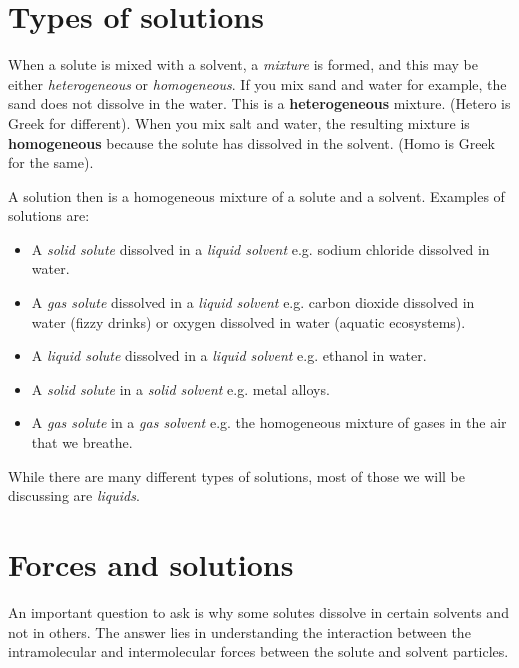    
\section{Types of solutions}
\label{sec:soln:types}

When a solute is mixed with a solvent, a \textit{mixture} is formed, and this may be either \textit{heterogeneous} or \textit{homogeneous}. If you mix sand and water for example, the sand does not dissolve in the water. This is a \textbf{heterogeneous} mixture. (Hetero is Greek for different). When you mix salt and water, the resulting mixture is \textbf{homogeneous} because the solute has dissolved in the solvent. (Homo is Greek for the same). \\


A solution then is a homogeneous mixture of a solute and a solvent. Examples of solutions are:

\begin{itemize}
\item{A \textit{solid solute} dissolved in a \textit{liquid solvent} e.g. sodium chloride dissolved in water.}
\item{A \textit{gas solute} dissolved in a \textit{liquid solvent} e.g. carbon dioxide dissolved in water (fizzy drinks) or oxygen dissolved in water (aquatic ecosystems).}
\item{A \textit{liquid solute} dissolved in a \textit{liquid solvent} e.g. ethanol in water.}
\item{A \textit{solid solute} in a \textit{solid solvent} e.g. metal alloys.}
\item{A \textit{gas solute} in a \textit{gas solvent} e.g. the homogeneous mixture of gases in the air that we breathe.}
\end{itemize}

While there are many different types of solutions, most of those we will  be discussing are \textit{liquids}.\\

\section{Forces and solutions}
\label{sec:soln:forces}

An important question to ask is why some solutes dissolve in certain solvents and not in others. The answer lies in understanding the interaction between the intramolecular and intermolecular forces between the solute and solvent particles. 

